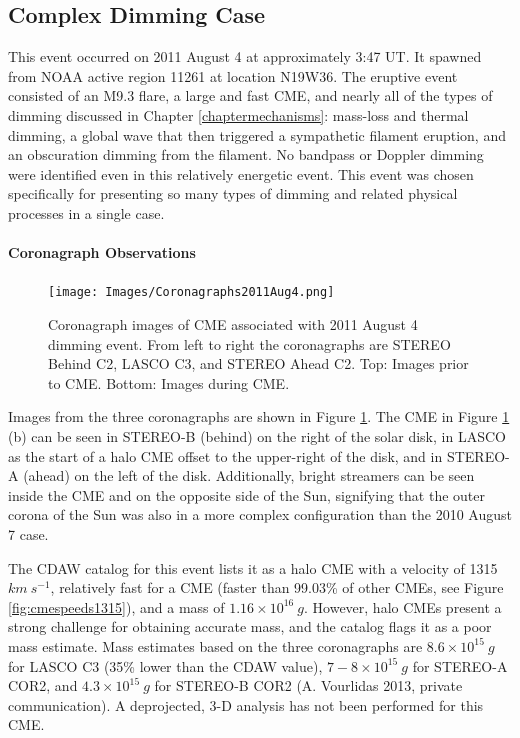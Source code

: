 \subsection{Complex Dimming Case}
This event occurred on 2011 August 4 at approximately 3:47 UT. It spawned from NOAA active region 11261 at location N19W36. The eruptive event consisted of an M9.3 flare, a large and fast CME, and nearly all of the types of dimming discussed in Chapter \ref{chaptermechanisms}: mass-loss and thermal dimming, a global wave that then triggered a sympathetic filament eruption, and an obscuration dimming from the filament. No bandpass or Doppler dimming were identified even in this relatively energetic event. This event was chosen specifically for presenting so many types of dimming and related physical processes in a single case. 

\paragraph{Coronagraph Observations}

\begin{figure}[!h]
    \begin{center}
	    \texttt{[image: Images/Coronagraphs2011Aug4.png]}
    \end{center}
    \caption[LASCO and STEREO coronagraph data for 2011 August 4 event]{ 
        Coronagraph images of CME associated with 2011 August 4 dimming event. 
        From left to right the coronagraphs are STEREO Behind C2, LASCO C3, and STEREO Ahead C2. Top: Images prior to CME. 
        Bottom: Images during CME. 
    }
    \label{coronagraphs2011aug4}
\end{figure}

Images from the three coronagraphs are shown in Figure \ref{coronagraphs2011aug4}. The CME in Figure \ref{coronagraphs2011aug4} (b) can be seen in STEREO-B (behind) on the right of the solar disk, in LASCO as the start of a halo CME offset to the upper-right of the disk, and in STEREO-A (ahead) on the left of the disk. Additionally, bright streamers can be seen inside the CME and on the opposite side of the Sun, signifying that the outer corona of the Sun was also in a more complex configuration than the 2010 August 7 case. 

The CDAW catalog for this event lists it as a halo CME with a velocity of 1315 $km\ s^{-1}$, relatively fast for a CME (faster than 99.03\% of other CMEs, see Figure \ref{fig:cmespeeds1315}), and a mass of $1.16 \times 10^{16}\ g$. However, halo CMEs present a strong challenge for obtaining accurate mass, and the catalog flags it as a poor mass estimate. Mass estimates based on the three coronagraphs are $8.6 \times 10^{15}\ g$ for LASCO C3 (35\% lower than the CDAW value), $7-8 \times 10^{15}\ g$ for STEREO-A COR2, and $4.3 \times 10^{15}\ g$ for STEREO-B COR2 (A. Vourlidas 2013, private communication). A deprojected, 3-D analysis has not been performed for this CME. 

